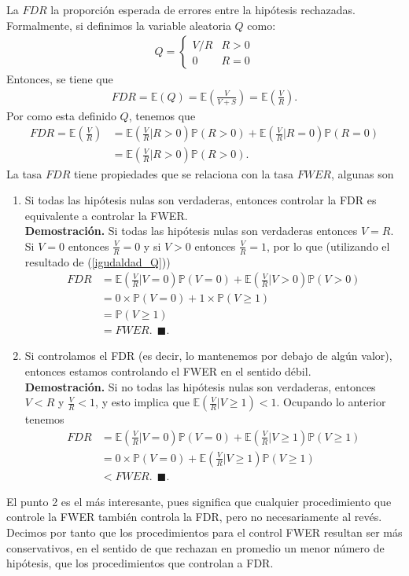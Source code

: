 \documentclass[11pt,letterpaper]{article}
\newcommand{\mP}{\mathbb{P}}
\newcommand{\mE}{\mathbb{E}}
\newcommand{\finf}{\blacksquare.}
\begin{document}
La $FDR$  la proporción esperada de errores entre la hipótesis rechazadas. Formalmente, si definimos la variable aleatoria $Q$ como:
\begin{align} \label{e_fdr}
Q=\left\{ \begin{array}{cc}
V/R & R>0\\
0 & R=0
\end{array} \right.
\end{align}
Entonces, se tiene que 
\begin{align*}
FDR = \mE(Q)=\mE\left( \frac{V}{V+S}\right)=\mE\left( \frac{V}{R} \right).
\end{align*}
Por como esta definido $Q$, tenemos que 
\begin{align}\label{igudaldad_Q}
FDR=\mE\left( \frac{V}{R} \right) &= \mE\left( \frac{V}{R}\left| R>0\right. \right)\mP(R>0)+\mE\left( \frac{V}{R}\left| R=0\right. \right)\mP(R=0)\\
&= \mE\left( \frac{V}{R}\left| R>0\right. \right)\mP(R>0).
\end{align}
La tasa $FDR$ tiene propiedades que se relaciona con la tasa $FWER$, algunas son
\begin{enumerate}
\item Si todas las hipótesis nulas son verdaderas, entonces controlar la FDR es equivalente a controlar la FWER. \\
\textbf{Demostración.} Si todas las hipótesis nulas son verdaderas entonces $V=R$. Si $V=0$ entonces $\frac{V}{R}=0$ y si $V>0$ entonces $\frac{V}{R}=1$, por lo que (utilizando el resultado de (\ref{igudaldad_Q}))
\begin{align*}
FDR &= \mE\left( \frac{V}{R}\left| V=0\right. \right)\mP(V=0)+\mE\left( \frac{V}{R}\left| V>0\right. \right)\mP(V>0)\\
&=0\times \mP(V=0)+1\times \mP(V\geq 1)\\
&= \mP(V\geq 1)\\
&= FWER.\ \ \finf
\end{align*}

\item  Si controlamos el FDR (es decir, lo mantenemos por debajo de algún valor), entonces estamos controlando el FWER en el sentido débil. \\
\textbf{Demostración.} Si no todas las hipótesis nulas son verdaderas, entonces $V<R$ y  $\frac{V}{R}<1$, y esto implica que $\mE\left( \frac{V}{R} |V\geq 1\right)<1$. Ocupando lo anterior tenemos
\begin{align*}
FDR&= \mE\left( \frac{V}{R}\left| V=0\right. \right)\mP(V=0)+\mE\left( \frac{V}{R}\left| V\geq 1\right. \right)\mP(V\geq 1)\\
&=0\times \mP(V=0)+\mE\left( \frac{V}{R}\left| V\geq 1\right. \right)\mP(V\geq 1)\\
&<FWER.\ \ \finf
\end{align*}

\end{enumerate}
El punto 2 es el más interesante, pues significa que cualquier procedimiento que controle la FWER también controla la FDR, pero no necesariamente al revés. Decimos por tanto que los procedimientos para el control FWER resultan ser más conservativos, en el sentido de que rechazan en promedio un menor número de hipótesis, que los procedimientos que controlan a FDR. 
\end{document}
